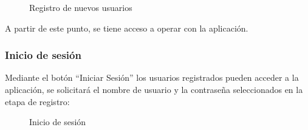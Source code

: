 \begin{figure} [!htb]
	\centering
	\caption{Registro de nuevos usuarios}
	\label{fig:registroUsuarios}
\end{figure}

A partir de este punto, se tiene acceso a operar con la aplicación.

\FloatBarrier
\subsubsection{Inicio de sesión}

Mediante el botón ``Iniciar Sesión'' los usuarios registrados pueden acceder a la aplicación, se solicitará el nombre de usuario y la contraseña seleccionados en la etapa de registro:

\begin{figure} [!htb]
	\centering
	\caption{Inicio de sesión}
	\label{fig:inicioSesion}
\end{figure}

